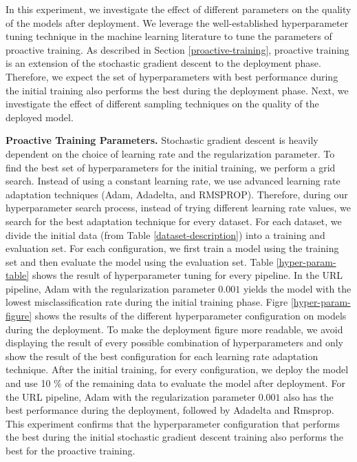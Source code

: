 In this experiment, we investigate the effect of different parameters on the quality of the models after deployment.
We leverage the well-established hyperparameter tuning technique in the machine learning literature to tune the parameters of proactive training.
As described in Section \ref{proactive-training}, proactive training is an extension of the stochastic gradient descent to the deployment phase.
Therefore, we expect the set of hyperparameters with best performance during the initial training also performs the best during the deployment phase.
Next, we investigate the effect of different sampling techniques on the quality of the deployed model.

\textbf{Proactive Training Parameters. }
Stochastic gradient descent is heavily dependent on the choice of learning rate and the regularization parameter.
To find the best set of hyperparameters for the initial training, we perform a grid search.
Instead of using a constant learning rate, we use advanced learning rate adaptation techniques (Adam, Adadelta, and RMSPROP).
Therefore, during our hyperparameter search process, instead of trying different learning rate values, we search for the best adaptation technique for every dataset.
For each dataset, we divide the initial data (from Table \ref{dataset-description}) into a training and evaluation set.
For each configuration, we first train a model using the training set and then evaluate the model using the evaluation set.
Table \ref{hyper-param-table} shows the result of hyperparameter tuning for every pipeline.
In the URL pipeline, Adam with the regularization parameter $0.001$ yields the model with the lowest misclassification rate during the initial training phase.
Figre \ref{hyper-param-figure} shows the results of the different hyperparameter configuration on models during the deployment.
To make the deployment figure more readable, we avoid displaying the result of every possible combination of hyperparameters and only show the result of the best configuration for each learning rate adaptation technique.
After the initial training, for every configuration, we deploy the model and use 10 \% of the remaining data to evaluate the model after deployment.
For the URL pipeline, Adam with the regularization parameter $0.001$ also has the best performance during the deployment, followed by Adadelta and Rmsprop.
This experiment confirms that the hyperparameter configuration that performs the best during the initial stochastic gradient descent training also performs the best for the proactive training.

